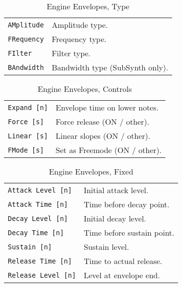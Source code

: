    \begin{table}[H]
      \centering
      \caption{Engine Envelopes, Type}
      \label{table:yoshimi_engine_envelopes_types}
      \begin{tabular}{l l}

\texttt{AMplitude} &
   Amplitude type. \\
\texttt{FRequency} &
   Frequency type. \\
\texttt{FIlter} &
   Filter type. \\
\texttt{BAndwidth} &
   Bandwidth type (SubSynth only). \\

      \end{tabular}
   \end{table}

   \begin{table}[H]
      \centering
      \caption{Engine Envelopes, Controls}
      \label{table:yoshimi_engine_envelopes_controls}
      \begin{tabular}{l l}

\texttt{Expand [n]} &
   Envelope time on lower notes. \\
\texttt{Force [s]} &
   Force release (ON / other). \\
\texttt{Linear [s]} &
   Linear slopes (ON / other). \\
\texttt{FMode [s]} &
   Set as Freemode (ON / other). \\

      \end{tabular}
   \end{table}

   \begin{table}[H]
      \centering
      \caption{Engine Envelopes, Fixed}
      \label{table:yoshimi_engine_envelopes_fixed}
      \begin{tabular}{l l}

\texttt{Attack Level [n]} &
   Initial attack level. \\
\texttt{Attack Time [n]} &
   Time before decay point. \\
\texttt{Decay Level [n]} &
   Initial decay level. \\
\texttt{Decay Time [n]} &
   Time before sustain point. \\
\texttt{Sustain [n]} &
   Sustain level. \\
\texttt{Release Time [n]} &
   Time to actual release. \\
\texttt{Release Level [n]} &
   Level at envelope end. \\

      \end{tabular}
   \end{table}

